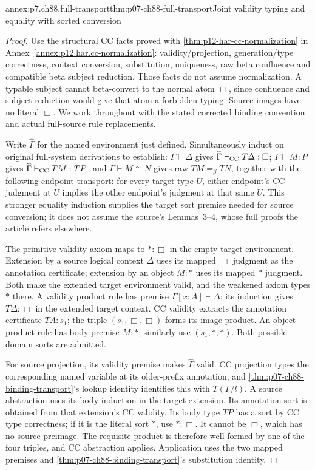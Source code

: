 \begin{annexitem}{annex:p7.ch88.full-transport}{thm:p07-ch88-full-transport}{Joint validity typing and equality with sorted conversion}
\begin{proof}
Use the structural CC facts proved with \cref{thm:p12-har-cc-normalization} in Annex~\ref{annex:p12.har.cc-normalization}: validity/projection, generation/type correctness, context conversion, substitution, uniqueness, raw beta confluence and compatible beta subject reduction. Those facts do not assume normalization. A typable subject cannot beta-convert to the normal atom \(\Box\), since confluence and subject reduction would give that atom a forbidden typing. Source images have no literal \(\Box\). We work throughout with the stated corrected binding convention and actual full-source rule replacements.

Write \(\widehat\Gamma\) for the named environment just defined.
Simultaneously induct on original full-system derivations to establish:
\(\Gamma\vdash\Delta\) gives
\(\widehat\Gamma\vdash_{\rm CC}T\Delta:\Box\);
\(\Gamma\vdash M:P\) gives
\(\widehat\Gamma\vdash_{\rm CC}TM:TP\);
and \(\Gamma\vdash M\cong N\) gives raw
\(TM=_\beta TN\), together with the following endpoint transport:
for every target type \(U\), either endpoint's CC judgment at \(U\)
implies the other endpoint's judgment at that same \(U\).
This stronger equality induction supplies the target sort premise needed
for source conversion; it does not assume the source's Lemmas~3--4,
whose full proofs the article refers elsewhere.

The primitive validity axiom maps to \(\ast:\Box\) in the empty
target environment. Extension by a source logical context \(\Delta\)
uses its mapped \(\Box\) judgment as the annotation certificate;
extension by an object \(M:\ast\) uses its mapped \(\ast\)
judgment. Both make the extended target environment valid, and the
weakened axiom types \(\ast\) there. A validity product rule has
premise \(\Gamma[x:A]\vdash\Delta\); its induction gives
\(T\Delta:\Box\) in the extended target context. CC validity
extracts the annotation certificate \(TA:s_1\); the triple
\((s_1,\Box,\Box)\) forms its image product. An object product rule
has body premise \(M:\ast\); similarly use
\((s_1,\ast,\ast)\). Both possible domain sorts are admitted.

For source projection, its validity premise makes
\(\widehat\Gamma\) valid. CC projection types the corresponding
named variable at its older-prefix annotation, and \cref{thm:p07-ch88-binding-transport}'s lookup
identity identifies this with \(T(\Gamma/l)\). A source abstraction
uses its body induction in the target extension. Its annotation sort
is obtained from that extension's CC validity. Its body type \(TP\)
has a sort by CC type correctness; if it is the literal sort \(\ast\),
use \(\ast:\Box\). It cannot be \(\Box\), which has no source
preimage. The requisite product is therefore well formed by one of
the four triples, and CC abstraction applies. Application uses the
two mapped premises and \cref{thm:p07-ch88-binding-transport}'s substitution identity.


\end{proof}
\end{annexitem}
